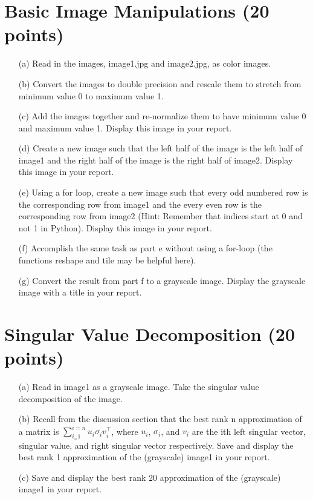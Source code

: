 \section{Basic Image Manipulations (20 points)}	
\begin{itemize}
	\item[(a)]
	Read in the images, image1.jpg and image2.jpg, as color images.
	
	\item[(b)]
	Convert the images to double precision and rescale them
	to stretch from minimum value 0 to maximum value 1.
	
	\item[(c)]
	Add the images together and re-normalize them to have minimum value 0
	and maximum value 1. Display this image in your report.
	
	\item[(d)]
	Create a new image such that the left half of the image is the left half of
	image1 and the right half of the image is the right half of image2. Display this image in your report.
	
	\item[(e)]
	Using a for loop, create a new image such that every odd numbered row is
	the corresponding row from image1 and the every even row is the corresponding row
	from image2 (Hint: Remember that indices start at 0 and not 1 in Python). Display this image in your report.
	
	\item[(f)]
	Accomplish the same task as part e without using a for-loop (the functions reshape and
  tile may be helpful here).
	
	\item[(g)]
	Convert the result from part f to a grayscale image. Display the grayscale image with
	a title in your report.
\end{itemize}
	
\section{Singular Value Decomposition (20 points)}
\begin{itemize}
	\item[(a)]
	Read in image1 as a grayscale image. Take the singular value
	decomposition of the image.

	\item[(b)]
  Recall from the discussion section that the best rank n approximation of a
  matrix is $\displaystyle\sum\limits_{i_=1}^{i=n}u_i \sigma_i v_i^{\top}$, 
  where $u_i$, $\sigma_i$,
  and $v_i$ are the ith left singular vector, singular value, and right singular
  vector respectively.
	Save and display the best rank 1 approximation of the (grayscale) image1 in your report.

	\item[(c)]
	Save and display the best rank 20 approximation of the (grayscale) image1 in your report.
\end{itemize}



